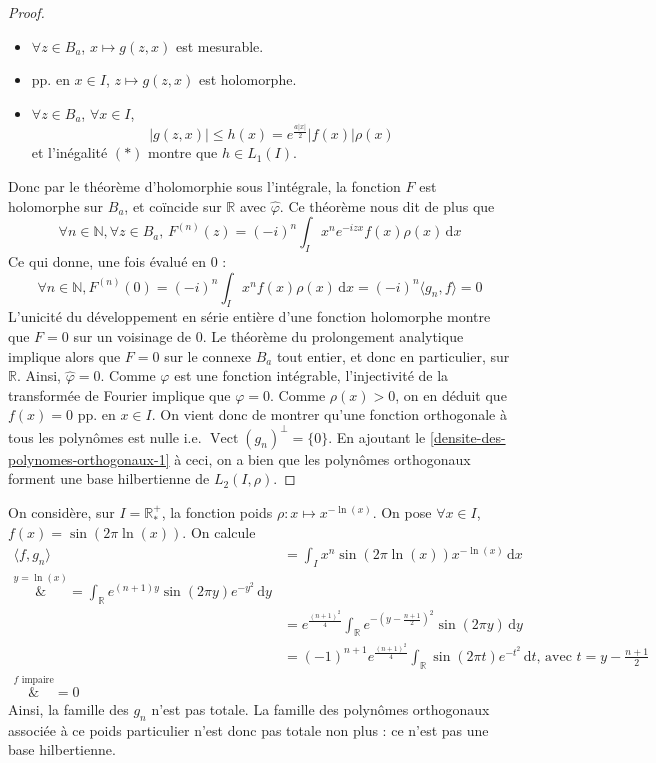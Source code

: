 \begin{proof}
\begin{itemize}
      \item $\forall z \in B_a$, $x \mapsto g(z, x)$ est mesurable.
      \item pp. en $x \in I$, $z \mapsto g(z, x)$ est holomorphe.
      \item $\forall z \in B_a$, $\forall x \in I$,
      \[ \vert g(z, x) \vert \leq h(x) = e^{\frac{a \vert x \vert}{2}} \vert f(x) \vert \rho(x) \]
      et l'inégalité $(*)$ montre que $h \in L_1(I)$.
    \end{itemize}
    Donc par le théorème d'holomorphie sous l'intégrale, la fonction $F$ est holomorphe sur $B_a$, et coïncide sur $\mathbb{R}$ avec $\widehat{\varphi}$.
    Ce théorème nous dit de plus que
    \[ \forall n \in \mathbb{N}, \forall z \in B_a, \, F^{(n)}(z) = (-i)^n \int_I x^n e^{-izx} f(x) \rho(x) \, \mathrm{d}x \]
    Ce qui donne, une fois évalué en $0$ :
    \[ \forall n \in \mathbb{N}, F^{(n)}(0) = (-i)^n \int_I x^n f(x) \rho(x) \, \mathrm{d}x = (-i)^n \langle g_n, f \rangle = 0 \]
    L'unicité du développement en série entière d'une fonction holomorphe montre que $F = 0$ sur un voisinage de $0$. Le théorème du prolongement analytique implique alors que $F = 0$ sur le connexe $B_a$ tout entier, et donc en particulier, sur $\mathbb{R}$. Ainsi, $\widehat{\varphi} = 0$. Comme $\varphi$ est une fonction intégrable, l'injectivité de la transformée de Fourier implique que $\varphi = 0$. Comme $\rho(x) > 0$, on en déduit que $f(x) = 0$ pp. en $x \in I$. On vient donc de montrer qu'une fonction orthogonale à tous les polynômes est nulle i.e. $\operatorname{Vect}(g_n)^\perp = \{ 0 \}$.
    En ajoutant le \cref{densite-des-polynomes-orthogonaux-1} à ceci, on a bien que les polynômes orthogonaux forment une base hilbertienne de $L_2(I, \rho)$.
  \end{proof}

  \begin{cexample}
    On considère, sur $I = \mathbb{R}^+_*$, la fonction poids $\rho : x \mapsto x^{-\ln(x)}$. On pose $\forall x \in I$, $f(x) = \sin(2 \pi \ln(x))$. On calcule
    \begin{align*}
      \langle f, g_n \rangle &= \int_I x^n \sin(2\pi \ln(x)) x^{-\ln(x)} \, \mathrm{d}x \\
      \overset{y = \ln(x)}&{=} \int_{\mathbb{R}} e^{(n+1)y} \sin(2 \pi y) e^{-y^2} \, \mathrm{d}y \\
      &= e^{\frac{(n+1)^2}{4}} \int_{\mathbb{R}} e^{- \left (y - \frac{n+1}{2} \right)^2} \sin(2 \pi y) \, \mathrm{d}y \\
      &= (-1)^{n+1} e^{\frac{(n+1)^2}{4}} \int_{\mathbb{R}} \sin(2 \pi t) e^{-t^2} \, \mathrm{d}t \text{, avec } t = y - \frac{n+1}{2} \\
      \overset{f \text{ impaire}}&{=} 0
    \end{align*}
    Ainsi, la famille des $g_n$ n'est pas totale. La famille des polynômes orthogonaux associée à ce poids particulier n'est donc pas totale non plus : ce n'est pas une base hilbertienne.
  \end{cexample}

